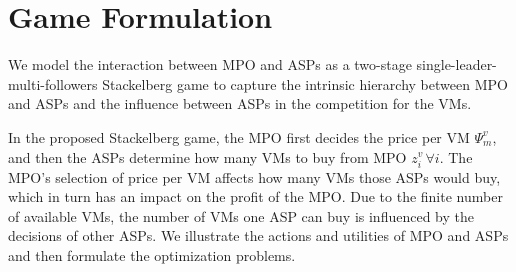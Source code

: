 \documentclass[conference]{IEEEtran}
\begin{document}
\section{Game Formulation}
We model the interaction between MPO and ASPs as a two-stage single-leader-multi-followers Stackelberg game to capture the intrinsic hierarchy between MPO and ASPs and the influence between ASPs in the competition for the VMs.

In the proposed Stackelberg game, the MPO first decides the price per VM $\Psi_{m}^v$, and then the ASPs determine how many VMs to buy from MPO $z_i^v \, \forall i$. The MPO's selection of price per VM affects how many VMs those ASPs would buy, which in turn has an impact on the profit of the MPO. %
Due to the finite number of available VMs, the number of VMs one ASP can buy is influenced by the decisions of other ASPs. %
We illustrate the actions and utilities of MPO and ASPs and then formulate the optimization problems.%
\end{document}
